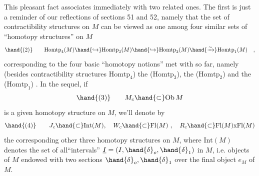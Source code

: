This pleasant fact associates immediately with two related
ones. The first is just a reminder of our reflections of sections 51 and
52, namely that the set of contractibility structures on $M$ can be viewed
as one among four similar sets of ``homotopy structures'' on $M$
\[ \hand{(2)} \qquad \mathrm{Homtp}_4(M) \hand{\hookrightarrow} \mathrm{Homtp}_3(M) \hand{\hookrightarrow} \mathrm{Homtp}_2(M) \hand{\xrightarrow{\sim}} \mathrm{Homtp}_1(M) \quad , \]
corresponding to the four  basic ``homotopy notions'' met with so far,
namely (besides contractibility structures $\mathrm{Homtp}_4$) the  \hand{\uline{\textcolor{black}{homotopy
interval structures}}} ($\mathrm{Homtp}_3$), the \hand{\uline{\textcolor{black}{homotopism structures}}}  ($\mathrm{Homtp}_2$) and
the \hand{\uline{\textcolor{black}{homotopy relations}}}  ($\mathrm{Homtp}_1$) . In the sequel, if 
\[ \hand{(3)} \qquad M_c \hand{\subset} \mathrm{Ob}\, M \]
is a given homotopy structure on $M$, we'll denote by 
\[ \hand{(4)} \qquad J_c \hand{\subset} \mathrm{Int}(M), \quad W_c \hand{\subset} \mathrm{Fl}(M) \ , \quad R_c \hand{\subset} \mathrm{Fl}(M)\text{x}\mathrm{Fl}(M) \]
the corresponding other three homotopy structures on $M$, where $\mathrm{Int}(M)$
denotes the set of all``intervals'' $\underline{I} = (I, \hand{\delta}_o, \hand{\delta}_1)$ in $M$, i.e. objects of
$M$ endowed with two sections $\hand{\delta}_o,\hand{\delta}_1$ over the final object $e_M$ of $M$.

